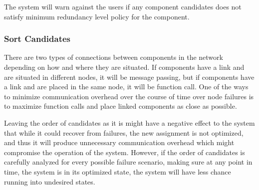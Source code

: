 The system will warn against the users if any component candidates does not
satisfy minimum redundancy level policy for the
component.

\subsubsection{Sort Candidates}

There are two types of connections between components in the network depending
on how and where they are situated. If components have a link and are situated
in different nodes, it will be message passing, but if components have a link
and are placed in the same node, it will be function call. One of the ways to
minimize communication overhead over the course of time over node failures is
to maximize function calls and place linked components as close as possible.

Leaving the order of candidates as it is might have a negative effect to the
system that while it could recover from failures, the new assignment is not
optimized, and thus it will produce unnecessary communication overhead which
might compromise the operation of the system.
However, if the order of candidates is carefully analyzed for every possible
failure scenario, making sure at any point in time, the system is in its
optimized state, the system will have less chance running into undesired
states.

